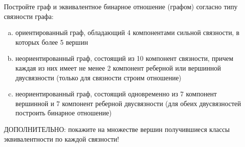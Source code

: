 \question 
Постройте граф и эквивалентное бинарное отношение (графом) согласно типу связности графа:\\
\begin{enumerate} [a)]\setcounter{enumi}{0}
\item ориентированный граф, обладающий 4 компонентами сильной связности, в которых более 5 вершин
\item неориентированный граф, состоящий из 10 компонент связности, причем каждая из них имеет не менее 2 компонент реберной или вершинной двусвязности (только для связности строим отношение)
\item неориентированный граф, состоящий одновременно из 7 компонент вершинной и 7 компонент реберной двусвязности (для обеих двусвязностей построить бинарное отношение)
\end{enumerate} 
ДОПОЛНИТЕЛЬНО: покажите на множестве вершин получившиеся классы эквивалентности по каждой связности!